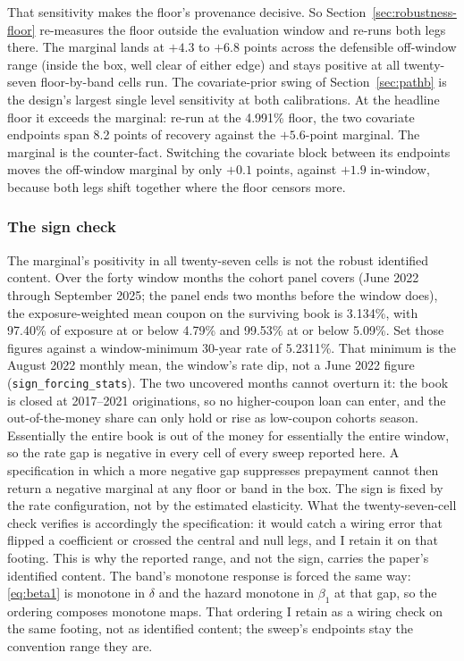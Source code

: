 \documentclass[12pt]{article}
\begin{document}
That sensitivity makes the floor's provenance decisive. So Section~\ref{sec:robustness-floor} re-measures the floor outside the evaluation window and re-runs both legs there. The marginal lands at $+4.3$ to $+6.8$ points across the defensible off-window range (inside the box, well clear of either edge) and stays positive at all twenty-seven floor-by-band cells run. The covariate-prior swing of Section~\ref{sec:pathb} is the design's largest single level sensitivity at both calibrations. At the headline floor it exceeds the marginal: re-run at the 4.991\% floor, the two covariate endpoints span 8.2 points of recovery against the $+5.6$-point marginal. The marginal is the counter-fact. Switching the covariate block between its endpoints moves the off-window marginal by only $+0.1$ points, against $+1.9$ in-window, because both legs shift together where the floor censors more.

\subsubsection{The sign check}

The marginal's positivity in all twenty-seven cells is not the robust identified content. Over the forty window months the cohort panel covers (June 2022 through September 2025; the panel ends two months before the window does), the exposure-weighted mean coupon on the surviving book is 3.134\%, with 97.40\% of exposure at or below 4.79\% and 99.53\% at or below 5.09\%. Set those figures against a window-minimum 30-year rate of 5.2311\%. That minimum is the August 2022 monthly mean, the window's rate dip, not a June 2022 figure (\texttt{sign\_forcing\_stats}). The two uncovered months cannot overturn it: the book is closed at 2017--2021 originations, so no higher-coupon loan can enter, and the out-of-the-money share can only hold or rise as low-coupon cohorts season. Essentially the entire book is out of the money for essentially the entire window, so the rate gap is negative in every cell of every sweep reported here. A specification in which a more negative gap suppresses prepayment cannot then return a negative marginal at any floor or band in the box. The sign is fixed by the rate configuration, not by the estimated elasticity. What the twenty-seven-cell check verifies is accordingly the specification: it would catch a wiring error that flipped a coefficient or crossed the central and null legs, and I retain it on that footing. This is why the reported range, and not the sign, carries the paper's identified content. The band's monotone response is forced the same way: \eqref{eq:beta1} is monotone in $\delta$ and the hazard monotone in $\beta_1$ at that gap, so the ordering composes monotone maps. That ordering I retain as a wiring check on the same footing, not as identified content; the sweep's endpoints stay the convention range they are.
\end{document}
